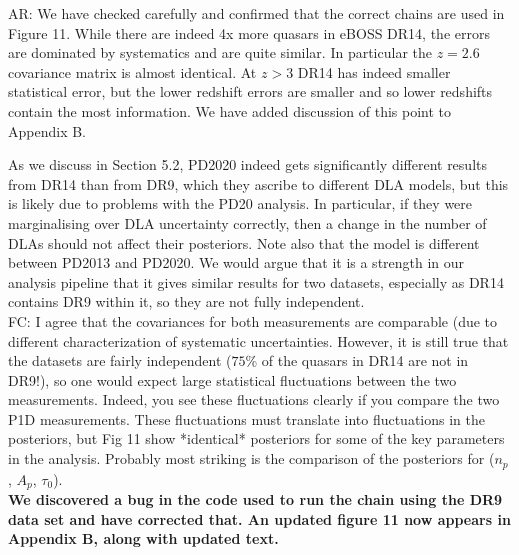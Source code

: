 \documentclass[12pt]{article}
\begin{document}
AR: We have checked carefully and confirmed that the correct chains are used in Figure 11. While there are indeed 4x more quasars in eBOSS DR14, the errors are dominated by systematics and are quite similar. In particular the $z=2.6$ covariance matrix is almost identical. At $z > 3$ DR14 has indeed smaller statistical error, but the lower redshift errors are smaller and so lower redshifts contain the most information. We have added discussion of this point to Appendix B.

As we discuss in Section 5.2, PD2020 indeed gets significantly different results from DR14 than from DR9, which they ascribe to different DLA models, but this is likely due to problems with the PD20 analysis. In particular, if they were marginalising over DLA uncertainty correctly, then a change in the number of DLAs should not affect their posteriors. Note also that the model is different between PD2013 and PD2020.  We would argue that it is a strength in our analysis pipeline that it gives similar results for two datasets, especially as DR14 contains DR9 within it, so they are not fully independent.\\

FC: I agree that the covariances for both measurements are comparable (due to different characterization of systematic uncertainties. However, it is still true that the datasets are fairly independent ($75\%$ of the quasars in DR14 are not in DR9!), so one would expect large statistical fluctuations between the two measurements. Indeed, you see these fluctuations clearly if you compare the two P1D measurements. These fluctuations must translate into fluctuations in the posteriors, but Fig 11 show *identical* posteriors for some of the key parameters in the analysis. Probably most striking is the comparison of the posteriors for ($n_p$, $A_p$, $\tau_0$).\\

\textbf{We discovered a bug in the code used to run the chain using the DR9 data set and have corrected that. An updated figure 11 now appears in Appendix B, along with updated text.}
\end{document}

